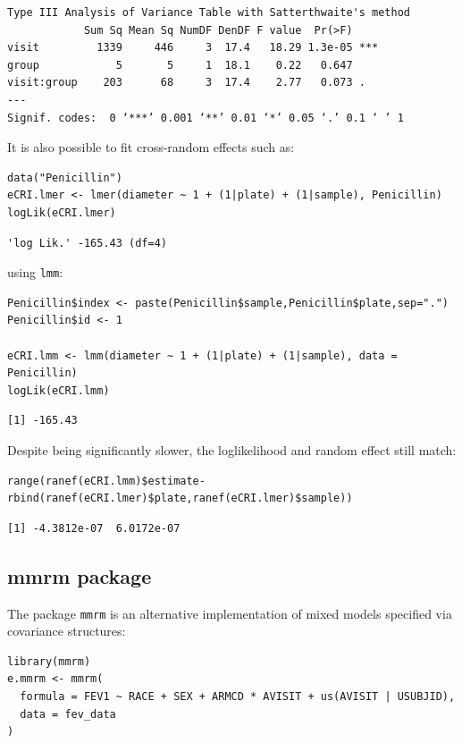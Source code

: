 \documentclass[12pt]{article}
\begin{document}
\begin{verbatim}
Type III Analysis of Variance Table with Satterthwaite's method
            Sum Sq Mean Sq NumDF DenDF F value  Pr(>F)    
visit         1339     446     3  17.4   18.29 1.3e-05 ***
group            5       5     1  18.1    0.22   0.647    
visit:group    203      68     3  17.4    2.77   0.073 .  
---
Signif. codes:  0 ‘***’ 0.001 ‘**’ 0.01 ‘*’ 0.05 ‘.’ 0.1 ‘ ’ 1
\end{verbatim}


It is also possible to fit cross-random effects such as:
\lstset{language=r,label= ,caption= ,captionpos=b,numbers=none}
\begin{lstlisting}
data("Penicillin")
eCRI.lmer <- lmer(diameter ~ 1 + (1|plate) + (1|sample), Penicillin)
logLik(eCRI.lmer)
\end{lstlisting}

\begin{verbatim}
'log Lik.' -165.43 (df=4)
\end{verbatim}



using \texttt{lmm}:
\lstset{language=r,label= ,caption= ,captionpos=b,numbers=none}
\begin{lstlisting}
Penicillin$index <- paste(Penicillin$sample,Penicillin$plate,sep=".")
Penicillin$id <- 1

eCRI.lmm <- lmm(diameter ~ 1 + (1|plate) + (1|sample), data = Penicillin)
logLik(eCRI.lmm)
\end{lstlisting}

\begin{verbatim}
[1] -165.43
\end{verbatim}


Despite being significantly slower, the loglikelihood and random
effect still match:
\lstset{language=r,label= ,caption= ,captionpos=b,numbers=none}
\begin{lstlisting}
range(ranef(eCRI.lmm)$estimate-rbind(ranef(eCRI.lmer)$plate,ranef(eCRI.lmer)$sample))
\end{lstlisting}

\begin{verbatim}
[1] -4.3812e-07  6.0172e-07
\end{verbatim}

\subsection{mmrm package}
\label{sec:orga77de21}

The package \texttt{mmrm} is an alternative implementation of mixed models
specified via covariance structures:
\lstset{language=r,label= ,caption= ,captionpos=b,numbers=none}
\begin{lstlisting}
library(mmrm)
e.mmrm <- mmrm(
  formula = FEV1 ~ RACE + SEX + ARMCD * AVISIT + us(AVISIT | USUBJID),
  data = fev_data
)
\end{lstlisting}
\end{document}
